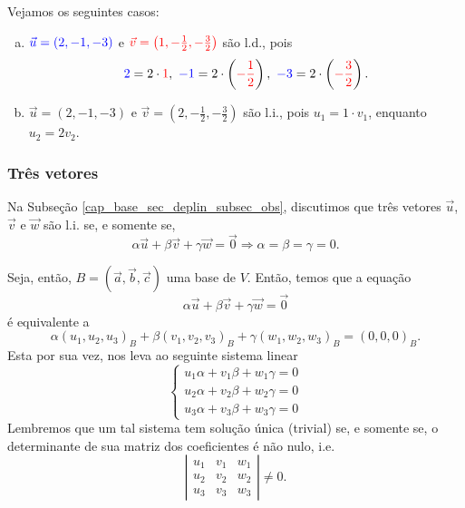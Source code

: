 \begin{ex}
  Vejamos os seguintes casos:
  \begin{enumerate}[a)]
  \item ${\color{blue}\vec{u} = (2,-1,-3)}$ e ${\color{red}\vec{v} = \left(1,-\frac{1}{2},-\frac{3}{2}\right)}$ são l.d., pois
    \begin{equation}
      {\color{blue}2} = 2\cdot {\color{red}1},~{\color{blue}-1} = 2\cdot\left({\color{red}-\frac{1}{2}}\right),~{\color{blue}-3} = 2\cdot\left({\color{red}-\frac{3}{2}}\right).
    \end{equation}
  \item $\vec{u} = (2,-1,-3)$ e $\vec{v} = \left(2,-\frac{1}{2},-\frac{3}{2}\right)$ são l.i., pois $u_1 = 1\cdot v_1$, enquanto $u_2 = 2v_2$.
  \end{enumerate}
\end{ex}

\subsubsection{Três vetores}

Na Subseção \ref{cap_base_sec_deplin_subsec_obs}, discutimos que três vetores $\vec{u}$, $\vec{v}$ e $\vec{w}$ são l.i. se, e somente se,
\begin{equation}
  \alpha\vec{u}+\beta\vec{v}+\gamma\vec{w}=\vec{0} \Rightarrow \alpha=\beta=\gamma=0.
\end{equation}

Seja, então, $B = (\vec{a}, \vec{b}, \vec{c})$ uma base de $V$. Então, temos que a equação
\begin{equation}
  \alpha\vec{u}+\beta\vec{v}+\gamma\vec{w} = \vec{0}
\end{equation}
é equivalente a
\begin{equation}
  \alpha(u_1,u_2,u_3)_B+\beta(v_1,v_2,v_3)_B+\gamma(w_1,w_2,w_3)_B=(0, 0, 0)_B.
\end{equation}
Esta por sua vez, nos leva ao seguinte sistema linear
\begin{equation}
  \left\{
    \begin{array}{l}
      u_1\alpha + v_1\beta + w_1\gamma = 0\\
      u_2\alpha + v_2\beta + w_2\gamma = 0\\
      u_3\alpha + v_3\beta + w_3\gamma = 0
    \end{array}
  \right.
\end{equation}
Lembremos que um tal sistema tem solução única (trivial) se, e somente se, o determinante de sua matriz dos coeficientes é não nulo, i.e.
\begin{equation}
  \left|\begin{array}{ccc}
    u_1 & v_1 & w_1\\
    u_2 & v_2 & w_2\\
    u_3 & v_3 & w_3
  \end{array}\right| \neq 0.
\end{equation}

